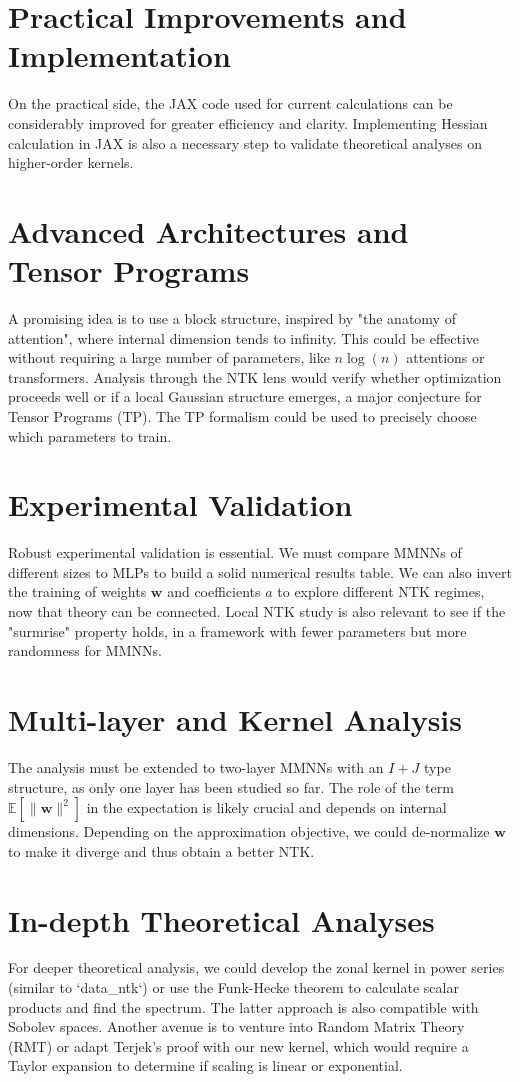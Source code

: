 \documentclass{article}
\begin{document}
\section{Practical Improvements and Implementation}
On the practical side, the JAX code used for current calculations can be considerably improved for greater efficiency and clarity. Implementing Hessian calculation in JAX is also a necessary step to validate theoretical analyses on higher-order kernels.

\section{Advanced Architectures and Tensor Programs}
A promising idea is to use a block structure, inspired by "the anatomy of attention", where internal dimension tends to infinity. This could be effective without requiring a large number of parameters, like $n\log(n)$ attentions or transformers. Analysis through the NTK lens would verify whether optimization proceeds well or if a local Gaussian structure emerges, a major conjecture for Tensor Programs (TP). The TP formalism could be used to precisely choose which parameters to train.

\section{Experimental Validation}
Robust experimental validation is essential. We must compare MMNNs of different sizes to MLPs to build a solid numerical results table. We can also invert the training of weights $\bm{w}$ and coefficients $a$ to explore different NTK regimes, now that theory can be connected. Local NTK study is also relevant to see if the "surmrise" property holds, in a framework with fewer parameters but more randomness for MMNNs.

\section{Multi-layer and Kernel Analysis}
The analysis must be extended to two-layer MMNNs with an $I+J$ type structure, as only one layer has been studied so far. The role of the term $\mathbb{E}[\|\bm{w}\|^2]$ in the expectation is likely crucial and depends on internal dimensions. Depending on the approximation objective, we could de-normalize $\bm{w}$ to make it diverge and thus obtain a better NTK.

\section{In-depth Theoretical Analyses}
For deeper theoretical analysis, we could develop the zonal kernel in power series (similar to `data_ntk`) or use the Funk-Hecke theorem to calculate scalar products and find the spectrum. The latter approach is also compatible with Sobolev spaces. Another avenue is to venture into Random Matrix Theory (RMT) or adapt Terjek's proof with our new kernel, which would require a Taylor expansion to determine if scaling is linear or exponential.
\end{document}
